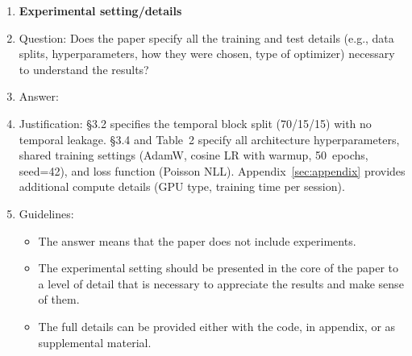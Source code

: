 \begin{enumerate}
\item {\bf Experimental setting/details}
    \item[] Question: Does the paper specify all the training and test details (e.g., data splits, hyperparameters, how they were chosen, type of optimizer) necessary to understand the results?
    \item[] Answer: \answerYes{}
    \item[] Justification: \S3.2 specifies the temporal block split
      (70/15/15) with no temporal leakage.  \S3.4 and Table~2
      specify all architecture hyperparameters, shared training
      settings (AdamW, cosine LR with warmup, 50~epochs, seed=42),
      and loss function (Poisson NLL).  Appendix~\ref{sec:appendix}
      provides additional compute details (GPU type, training time per
      session).
    \item[] Guidelines:
    \begin{itemize}
        \item The answer \answerNA{} means that the paper does not include experiments.
        \item The experimental setting should be presented in the core of the paper to a level of detail that is necessary to appreciate the results and make sense of them.
        \item The full details can be provided either with the code, in appendix, or as supplemental material.
    \end{itemize}


\end{enumerate}
